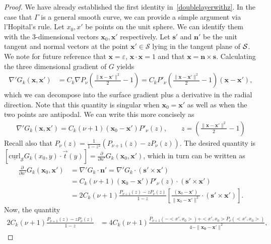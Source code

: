 \documentclass[final]{siamltex}
\newcommand{\C}{C_k}
\renewcommand{\S} {\mathcal{S}}
\newcommand{\e}{\varepsilon}
\begin{document}
\begin{proof}
We have already established the first identity
in~\eqref{doublelayerwithz}. In the case that $\Gamma$ is a general
smooth curve, we can provide a simple argument via l'Hopital's rule.
Let $x_0,x'$ be points on the unit sphere. We can identify them with the
3-dimensional vectors ${\mathbf x_0},{\mathbf x'}$ respectively.  Let
${\mathbf s}'$ and ${\mathbf n}'$ be the unit tangent and normal vectors
at the point ${\mathbf x}' \in \mathcal{S}$ lying in the tangent plane
of ${\cal S}$.  We note for future reference that $\mathbf{x}=\e$,
$\mathbf{x} \cdot \mathbf{x} = 1$ and that $\mathbf{x} = \mathbf{n}
\times \mathbf{s}$.  Calculating the three dimensional gradient of $G$
yields
\begin{align*}
  \nabla' G_k({\mathbf x},{\mathbf x}') &= \C \nabla P_\nu\left(
    \frac{\|{\mathbf x}-{\mathbf x}'\|^2}{2}-1\right) = 
  \C P'_\nu\left(\frac{\|{\mathbf x}-{\mathbf x}'\|^2}{2}-1\right)
    (\mathbf{x}-\mathbf{x'}),
\end{align*}
which we can decompose into the surface gradient plus a derivative in
the radial direction. Note that this quantity is singular when
$\mathbf{x}_0 = \mathbf{x'}$ as well as when the two points are
antipodal. We can write this more concisely as
\begin{align*}
\nabla' G_k({\mathbf x},{\mathbf x}')=\C(\nu+1)(\mathbf{x}_0-\mathbf{x'})P'_{\nu}(z), \qquad 
  z=\left(\frac{\|{\mathbf x}-{\mathbf x}'\|^2}{2}-1\right)
\end{align*}
Recall also that 
$P_{\nu}(z)=\frac{1}{1-z^2}(P_{\nu+1}(z)-z P_{\nu}(z))$.  The desired
quantity is $[\underline{\mbox{curl}}_{\S}G_{k}(x_{0},y) \cdot
\vec{t}(y)]= \frac{\partial}{\partial n'}
G_k(\mathbf{x}_0,\mathbf{x}')$, which in turn can be written as 
\begin{align}
 \frac{\partial \, }{\partial n'} G_k({\mathbf x}_0,{\mathbf x}') &
 =\nabla' G_k \cdot {\mathbf n}' = \nabla' G_k\cdot \left( \mathbf{s}'
 \times {\mathbf x}' \right) \nonumber \\
 &=\C(\nu+1)(\mathbf{x}_0-\mathbf{x'})P'_{\nu}(z)\cdot \left(
 \mathbf{s}' \times {\mathbf x}' \right) \nonumber\\
 &= 2\C(\nu+1)\frac{P_{\nu+1}(z)-zP_{\nu}(z)}{1-z} \left[
 \frac{(\mathbf{x}_0-\mathbf{x'})}{\|\mathbf{x}_0-\mathbf{x'}\|^2}\cdot
 \left( \mathbf{s}' \times {\mathbf x}' \right)\right].
 \label{kern1}
\end{align} 
Now, the quantity
\begin{align*}
2\C(\nu+1)\frac{P_{\nu+1}(z)-zP_{\nu}(z)}{1-z}&=4\C(\nu+1)\frac{P_{\nu+1}(-<x',x_0>)+<x',x_0>P_{\nu}(<x',x_0>)}{4-\|\mathbf{x_0}-\mathbf{x'}\|^2},

\end{align*}
\end{proof}
\end{document}
